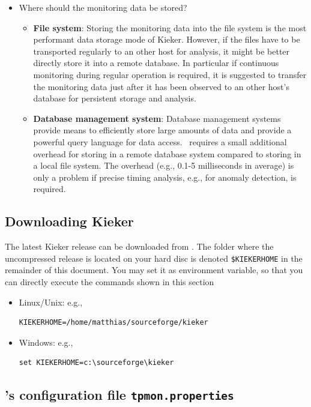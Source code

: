 \documentclass[a4paper,12pt]{scrartcl}
\begin{document}
\begin{itemize}
\begin{itemize}
\end{itemize}
\item Where should the monitoring data be stored?
\begin{itemize}
\item \textbf{File system}: Storing the monitoring data into the file system is the most performant data storage mode of Kieker. However, if the files have to be transported regularly to an other host for analysis, it might be better directly store it into a remote database. In particular if continuous monitoring during regular operation is required, it is suggested to transfer the monitoring data just after it has been observed to an other host's database for persistent storage and analysis.
\item \textbf{Database management system}: Database management systems provide means to efficiently store large amounts of data and provide a powerful query language for data access. \tpmon\ requires a small additional overhead for storing in a remote database system compared to storing in a local file system. The overhead (e.g., 0.1-5 milliseconds in average) is only a problem if precise timing analysis, e.g., for anomaly detection, is required. %
\end{itemize}
\end{itemize}

\subsection{Downloading Kieker}
The latest Kieker release can be downloaded from \kiekerurl. The folder where the uncompressed release is located on your hard disc is denoted \texttt{\$KIEKERHOME} in the remainder of this document. You may set it as environment variable, so that you can directly execute the commands shown in this section
\begin{itemize}
 \item Linux/Unix: e.g.,
\begin{lstlisting}[caption={}]
KIEKERHOME=/home/matthias/sourceforge/kieker
\end{lstlisting}
\item Windows: e.g.,
\begin{lstlisting}[caption={}]
set KIEKERHOME=c:\sourceforge\kieker
\end{lstlisting}
\end{itemize}

\subsection{\tpmon's configuration file \texttt{tpmon.properties}}\label{sec.tpmon.properties}
\end{document}
